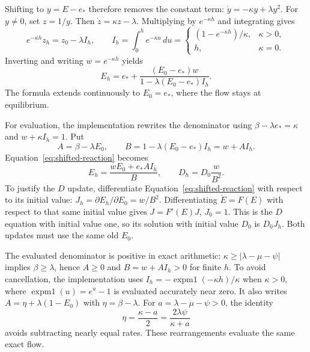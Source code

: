 \documentclass[11pt]{article}
\begin{document}
Shifting to $y=E-e_*$ therefore removes the constant term:
$\dot y=-\kappa y+\lambda y^2$. For $y\ne0$, set $z=1/y$. Then
$\dot z=\kappa z-\lambda$. Multiplying by $e^{-\kappa h}$ and integrating gives
\[
 e^{-\kappa h}z_h=z_0-\lambda I_h,\qquad
 I_h=\int_0^h e^{-\kappa u}\,du
 =\begin{cases}(1-e^{-\kappa h})/\kappa,&\kappa>0,\\h,&\kappa=0.\end{cases}
\]
Inverting and writing $w=e^{-\kappa h}$ yields
\begin{equation}\label{eq:shifted-reaction}
 E_h=e_*+\frac{(E_0-e_*)w}{1-\lambda(E_0-e_*)I_h}.
\end{equation}
The formula extends continuously to $E_0=e_*$, where the flow stays at equilibrium.

For evaluation, the implementation rewrites the denominator using
$\beta-\lambda e_*=\kappa$ and $w+\kappa I_h=1$. Put
\[
 A=\beta-\lambda E_0,\qquad
 B=1-\lambda(E_0-e_*)I_h=w+A I_h.
\]
Equation~\eqref{eq:shifted-reaction} becomes
\begin{equation}\label{eq:reaction-update}
 \boxed{\quad E_h=\frac{wE_0+e_* A I_h}{B},\qquad
               D_h=D_0\frac{w}{B^2}.\quad}
\end{equation}
To justify the $D$ update, differentiate Equation~\eqref{eq:shifted-reaction} with respect to
its initial value: $J_h=\partial E_h/\partial E_0=w/B^2$.
Differentiating $\dot E=F(E)$ with respect to that same initial value gives
$\dot J=F'(E)J$, $J_0=1$. This is the $D$ equation with initial value one, so its solution
with initial value $D_0$ is $D_0J_h$. Both updates must use the same old $E_0$.

The evaluated denominator is positive in exact arithmetic: $\kappa\geq
|\lambda-\mu-\psi|$ implies $\beta\geq\lambda$, hence $A\geq0$ and $B=w+A I_h>0$
for finite $h$. To avoid cancellation, the implementation uses
$I_h=-\operatorname{expm1}(-\kappa h)/\kappa$ when $\kappa>0$, where
$\operatorname{expm1}(u)=e^u-1$ is evaluated accurately near zero.
It also writes $A=\eta+\lambda(1-E_0)$ with $\eta=\beta-\lambda$.
For $a=\lambda-\mu-\psi>0$, the identity
\[
 \eta=\frac{\kappa-a}{2}=\frac{2\lambda\psi}{\kappa+a}
\]
avoids subtracting nearly equal rates. These rearrangements evaluate the same exact flow.
\end{document}
